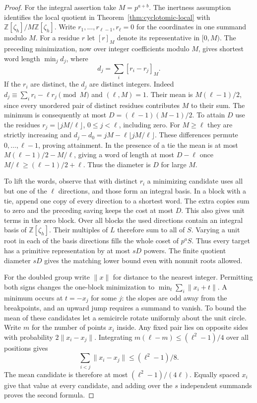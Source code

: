 \documentclass[11pt,letterpaper]{article}
\theoremstyle{definition}
\numberwithin{equation}{section}
\begin{document}
\begin{proof}
For the integral assertion take $M=p^{a+b}$. The inertness assumption
identifies the local quotient in Theorem~\ref{thm:cyclotomic-local}
with $\mathbb Z[\zeta_h]/M\mathbb Z[\zeta_h]$.
Write $r_1,\ldots,r_{\ell-1},r_\ell=0$ for the coordinates in one
summand modulo $M$. For a residue $r$ let $[r]_M$ denote its
representative in $[0,M)$. The preceding minimization, now over
integer coefficients modulo $M$, gives shortest word length
$\min_j d_j$, where
\[
                         d_j=\sum_i[r_i-r_j]_M.
\]
If the $r_i$ are distinct, the $d_j$ are distinct integers. Indeed
$d_j\equiv\sum_i r_i-\ell r_j\pmod M$ and $(\ell,M)=1$. Their mean
is $M(\ell-1)/2$, since every unordered pair of distinct residues
contributes $M$ to their sum. The minimum is consequently at most
$D=(\ell-1)(M-1)/2$. To attain $D$ use the residues
$r_j=\lfloor jM/\ell\rfloor$, $0\le j<\ell$, including zero.
For $M\ge\ell$ they are strictly increasing and
$d_j-d_0=jM-\ell\lfloor jM/\ell\rfloor$. These differences
permute $0,\ldots,\ell-1$, proving attainment. In the presence of a
tie the mean is at most $M(\ell-1)/2-M/\ell$, giving a word of
length at most $D-\ell$ once $M/\ell\ge(\ell-1)/2+\ell$.
Thus the diameter is $D$ for large $M$.

To lift the words, observe that with distinct $r_i$ a minimizing
candidate uses all but one of the $\ell$ directions, and those form
an integral basis. In a block with a tie, append one copy of every
direction to a shortest word. The extra copies sum to zero and the
preceding saving keeps the cost at most $D$. This also gives unit
terms in the zero block. Over all blocks the used directions contain
an integral basis of $\mathbb Z[\zeta_h]$. Their multiples of $L$
therefore sum to all of $S$. Varying a unit root in each of the
basis directions fills the whole coset of $p^aS$. Thus every target
has a primitive representation by at most $sD$ powers. The finite
quotient diameter $sD$ gives the matching lower bound even with
nonunit roots allowed.

For the doubled group write $\|x\|$ for distance to the nearest
integer. Permitting both signs changes the one-block minimization to
$\min_t\sum_i\|x_i+t\|$. A minimum occurs at $t=-x_j$ for some
$j$: the slopes are odd away from the breakpoints, and an upward
jump requires a summand to vanish. To bound the mean of these
candidates let a semicircle rotate uniformly about the unit circle.
Write $m$ for the number of points $x_i$ inside. Any fixed pair
lies on opposite sides with probability $2\|x_i-x_j\|$. Integrating
$m(\ell-m)\le(\ell^2-1)/4$ over all positions gives
\[
                \sum_{i<j}\|x_i-x_j\|\le(\ell^2-1)/8.
\]
The mean candidate is therefore at most $(\ell^2-1)/(4\ell)$.
Equally spaced $x_i$ give that value at every candidate, and adding
over the $s$ independent summands proves the second formula.
\end{proof}
\end{document}
